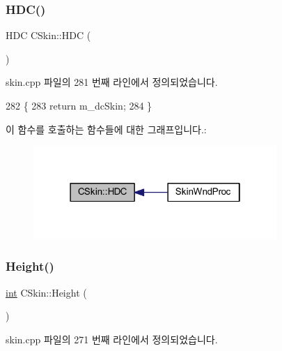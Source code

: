 \subsubsection{\texorpdfstring{H\+D\+C()}{HDC()}}
{\footnotesize\ttfamily H\+DC C\+Skin\+::\+H\+DC (\begin{DoxyParamCaption}{ }\end{DoxyParamCaption})}



skin.\+cpp 파일의 281 번째 라인에서 정의되었습니다.


\begin{DoxyCode}
282 \{
283   \textcolor{keywordflow}{return} m\_dcSkin;
284 \}
\end{DoxyCode}
이 함수를 호출하는 함수들에 대한 그래프입니다.\+:
\nopagebreak
\begin{figure}[H]
\begin{center}
\leavevmode
\includegraphics[width=262pt]{class_c_skin_a4112f4df38d9917d38c5db2622777c1f_icgraph}
\end{center}
\end{figure}
\mbox{\label{class_c_skin_a26de0d121ce1811feea27cc30f4c2f70}} 
\subsubsection{\texorpdfstring{Height()}{Height()}}
{\footnotesize\ttfamily \mbox{\hyperlink{_util_8cpp_a0ef32aa8672df19503a49fab2d0c8071}{int}} C\+Skin\+::\+Height (\begin{DoxyParamCaption}{ }\end{DoxyParamCaption})}



skin.\+cpp 파일의 271 번째 라인에서 정의되었습니다.



